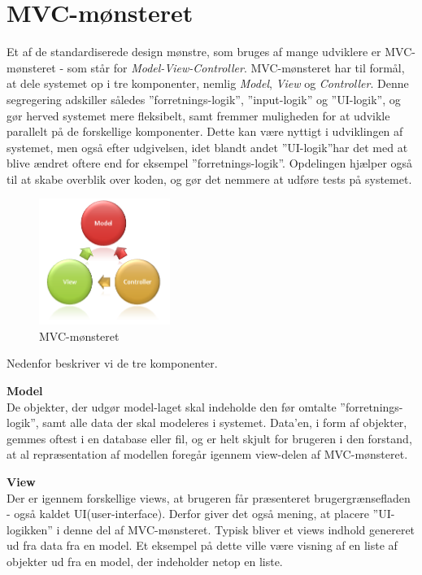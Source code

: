\chapter{MVC-mønsteret}
Et af de standardiserede design mønstre, som bruges af mange udviklere er MVC-mønsteret - som står for \textit{Model-View-Controller}.
MVC-mønsteret har til formål, at dele systemet op i tre komponenter, nemlig \textit{Model}, \textit{View} og \textit{Controller}.
Denne segregering adskiller således ''forretnings-logik'', ''input-logik'' og ''UI-logik'', og gør herved systemet mere fleksibelt, samt fremmer muligheden for at udvikle parallelt på de forskellige komponenter.
Dette kan være nyttigt i udviklingen af systemet, men også efter udgivelsen, idet blandt andet ''UI-logik''har det med at blive ændret oftere end for eksempel ''forretnings-logik''. 
Opdelingen hjælper også til at skabe overblik over koden, og gør det nemmere at udføre tests på systemet. \citep{MVC_Overview}

\begin{figure}
	\vspace{-20pt}
	\begin{center}
		\includegraphics[width=0.38\textwidth]{images/Images/mvc.png}
	\end{center}
	\vspace{-20pt}
	\caption{MVC-mønsteret}
	\vspace{-20pt}
\end{figure}
	

Nedenfor beskriver vi de tre komponenter.

\textbf{Model}\\
De objekter, der udgør model-laget skal indeholde den før omtalte ''forretnings-logik'', samt alle data der skal modeleres i systemet.
Data'en, i form af objekter, gemmes oftest i en database eller fil, og er helt skjult for brugeren i den forstand, at al repræsentation af modellen foregår igennem view-delen af MVC-mønsteret. 

\textbf{View}\\
Der er igennem forskellige views, at brugeren får præsenteret brugergrænsefladen - også kaldet UI(user-interface).
Derfor giver det også mening, at placere ''UI-logikken'' i denne del af MVC-mønsteret.
Typisk bliver et views indhold genereret ud fra data fra en model.
Et eksempel på dette ville være visning af en liste af objekter ud fra en model, der indeholder netop en liste.

